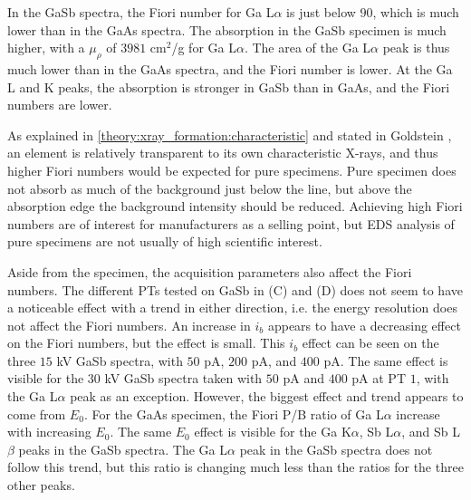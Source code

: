 In the GaSb spectra, the Fiori number for Ga L$\alpha$ is just below $90$, which is much lower than in the GaAs spectra.
The absorption in the GaSb specimen is much higher, with a $\mu_\rho$ of $3981$ cm$^2$/g for Ga L$\alpha$.
The area of the Ga L$\alpha$ peak is thus much lower than in the GaAs spectra, and the Fiori number is lower.
At the Ga L and K peaks, the absorption is stronger in GaSb than in GaAs, and the Fiori numbers are lower.


As explained in \cref{theory:xray_formation:characteristic} and stated in Goldstein \cite[Ch. 4.4]{goldstein_scanning_2018}, an element is relatively transparent to its own characteristic X-rays, and thus higher Fiori numbers would be expected for pure specimens.
Pure specimen does not absorb as much of the background just below the line, but above the absorption edge the background intensity should be reduced.
Achieving high Fiori numbers are of interest for manufacturers as a selling point, but EDS analysis of pure specimens are not usually of high scientific interest.




Aside from the specimen, the acquisition parameters also affect the Fiori numbers.
The different PTs tested on GaSb in (C) and (D) does not seem to have a noticeable effect with a trend in either direction, i.e. the energy resolution does not affect the Fiori numbers.
An increase in $i_b$ appears to have a decreasing effect on the Fiori numbers, but the effect is small.
This $i_b$ effect can be seen on the three $15$ kV GaSb spectra, with $50$ pA, $200$ pA, and $400$ pA.
The same effect is visible for the $30$ kV GaSb spectra taken with $50$ pA and $400$ pA at PT $1$, with the Ga L$\alpha$ peak as an exception.
However, the biggest effect and trend appears to come from $E_0$.
For the GaAs specimen, the Fiori P/B ratio of Ga L$\alpha$ increase with increasing $E_0$.
The same $E_0$ effect is visible for the Ga K$\alpha$, Sb L$\alpha$, and Sb L$\beta$ peaks in the GaSb spectra.
The Ga L$\alpha$ peak in the GaSb spectra does not follow this trend, but this ratio is changing much less than the ratios for the three other peaks.


